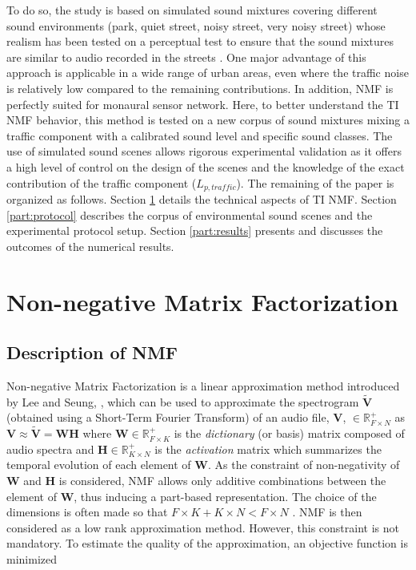 \documentclass[12pt,english,twoside]{article}
\begin{document}
To do so, the study is based on simulated sound mixtures covering different sound environments (park, quiet street, noisy street, very noisy street) whose realism has been tested on a perceptual test to ensure that the sound mixtures are similar to audio recorded in the streets \cite{gloaguen2017creation}. 
One major advantage of this approach is applicable in a wide range of urban areas, even where the traffic noise is relatively low compared to the remaining contributions. In addition, NMF is perfectly suited for monaural sensor network. 
Here, to better understand the TI NMF behavior, this method is tested on a new corpus of sound mixtures mixing a traffic component with a calibrated sound level and specific sound classes. The use of simulated sound scenes allows rigorous experimental validation as it offers a high level of control on the design of the scenes and the knowledge of the exact contribution of the traffic component ($L_{p,traffic}$).
The remaining of the paper is organized as follows. Section \ref{part:nmf} details the technical aspects of TI NMF. Section \ref{part:protocol} describes the corpus of environmental sound scenes and the experimental protocol setup. Section \ref{part:results} presents and discusses the outcomes of the numerical results.

\section{Non-negative Matrix Factorization}\label{part:nmf}
\subsection{Description of NMF}

Non-negative Matrix Factorization is a linear approximation method introduced by Lee and Seung, \cite{lee_learning_1999}, which can be used to approximate the spectrogram $\mathbf{\tilde{V}}$ (obtained using a Short-Term Fourier Transform) of an audio file, $\mathbf{V}$, $\in \mathbb{R}^+_{F \times N}$ as $\mathbf{V} \approx \mathbf{\tilde{V}} = \mathbf{WH}$
where $\mathbf{W} \in \mathbb{R}^+_{F \times K}$ is the \textit{dictionary} (or basis) matrix composed of audio spectra and $\mathbf{H} \in \mathbb{R}^+_{K \times N}$ is the \textit{activation} matrix which summarizes the temporal evolution of each element of $\mathbf{W}$. As the constraint of non-negativity of $\mathbf{W}$ and $\mathbf{H}$ is considered, NMF allows only additive combinations between the element of $\mathbf{W}$, thus inducing a part-based representation.
The choice of the dimensions is often made so that $F\times K + K \times N < F \times N$ \cite{fevotte_nonnegative_2009}. NMF is then considered as a low rank approximation method. However, this constraint is not mandatory. To estimate the quality of the approximation, an objective function is minimized
\end{document}
